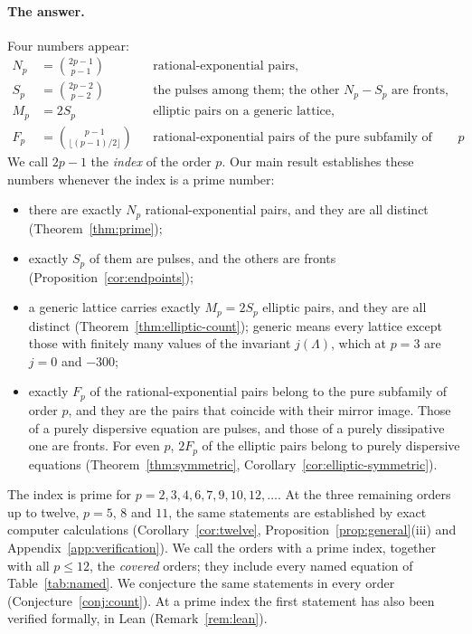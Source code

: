 \documentclass[11pt]{article}
\theoremstyle{definition}
\theoremstyle{remark}
\numberwithin{equation}{section}
\begin{document}
\paragraph{The answer.}
Four numbers appear:
\[
 \begin{aligned}
 N_p&=\binom{2p-1}{p-1}&&\text{rational-exponential pairs},\\
 S_p&=\binom{2p-2}{p-2}
     &&\text{the pulses among them; the other \(N_p-S_p\) are fronts},\\
 M_p&=2S_p&&\text{elliptic pairs on a generic lattice},\\
 F_p&=\binom{p-1}{\lfloor(p-1)/2\rfloor}
     &&\text{rational-exponential pairs of the pure subfamily of order
       \(p\)}.
 \end{aligned}
\]
We call \(2p-1\) the \emph{index} of the order \(p\). Our main result
establishes these numbers whenever the index is a prime number:
\begin{itemize}\setlength{\itemsep}{0pt}\setlength{\parsep}{0pt}
\item there are exactly \(N_p\) rational-exponential pairs, and they are
all distinct (Theorem~\ref{thm:prime});
\item exactly \(S_p\) of them are pulses, and the others are fronts
(Proposition~\ref{cor:endpoints});
\item a generic lattice carries exactly \(M_p=2S_p\) elliptic pairs, and
they are all distinct (Theorem~\ref{thm:elliptic-count}); generic means
every lattice except those with finitely many values of the invariant
\(j(\Lambda)\), which at \(p=3\) are \(j=0\) and \(-300\);
\item exactly \(F_p\) of the rational-exponential pairs belong to the
pure subfamily of order \(p\), and they are the pairs that coincide with
their mirror image. Those of a purely dispersive equation are pulses,
and those of a purely dissipative one are fronts. For even \(p\),
\(2F_p\) of the elliptic pairs belong to purely dispersive equations
(Theorem~\ref{thm:symmetric}, Corollary~\ref{cor:elliptic-symmetric}).
\end{itemize}
The index is prime for \(p=2,3,4,6,7,9,10,12,\ldots\). At the three
remaining orders up to twelve, \(p=5\), \(8\) and \(11\), the same
statements are established by exact computer calculations
(Corollary~\ref{cor:twelve}, Proposition~\ref{prop:general}(iii) and
Appendix~\ref{app:verification}). We call the orders with a prime index,
together with all \(p\le12\), the \emph{covered} orders; they include
every named equation of Table~\ref{tab:named}. We conjecture the same
statements in every order (Conjecture~\ref{conj:count}). At a prime
index the first statement has also been verified formally, in Lean
(Remark~\ref{rem:lean}).
\end{document}
